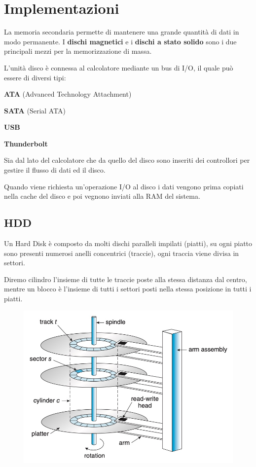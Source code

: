 \section{Implementazioni}
La memoria secondaria permette di mantenere una grande quantità di dati in modo permanente.
I \textbf{dischi magnetici} e i \textbf{dischi a stato solido} sono i due principali mezzi per la memorizzazione di massa.

\spacer
L'unità disco è connessa al calcolatore mediante un bus di I/O, il quale può essere di diversi tipi:
\begin{sitemize}
    \item \textbf{ATA} (Advanced Technology Attachment)
    \item \textbf{SATA} (Serial ATA)
    \item \textbf{USB}
    \item \textbf{Thunderbolt}
\end{sitemize}
\spacer
Sia dal lato del calcolatore che da quello del disco sono inseriti dei controllori per gestire il flusso di dati ed il disco.

Quando viene richiesta un'operazione I/O al disco i dati vengono prima copiati nella cache del disco e poi vegnono inviati alla RAM del sistema.

\subsection{HDD}
Un Hard Disk è composto da molti dischi paralleli impilati (piatti), su ogni piatto sono presenti numerosi anelli concentrici (traccie), ogni traccia viene divisa in settori.

Diremo cilindro l'insieme di tutte le traccie poste alla stessa distanza dal centro, mentre un blocco è l'insieme di tutti i settori posti nella stessa posizione in tutti i piatti.

\begin{figure}[H]
    \centering
    \includegraphics[width=0.5\linewidth]{assets/hdd.jpg}
\end{figure}

